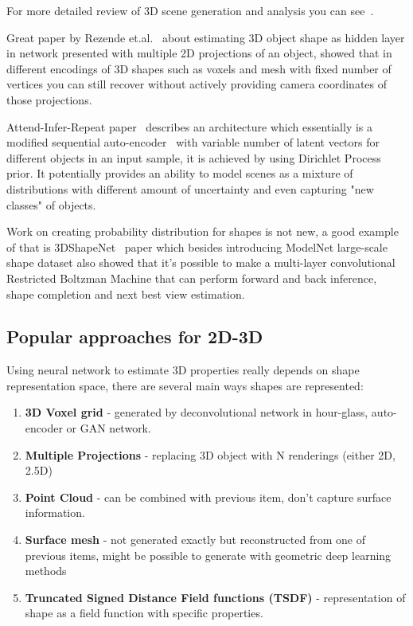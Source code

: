 For more detailed review of 3D scene generation and analysis you can see~\cite{2017arXiv170609577M}.

Great paper by Rezende et.al.~\cite{rezende2016unsupervised} about estimating 3D object shape as hidden layer in network presented with multiple 2D projections of an object, showed that in different encodings of 3D shapes such as voxels and mesh with fixed number of vertices you can still recover without actively providing camera coordinates of those projections. 

Attend-Infer-Repeat paper~\cite{eslami2016attend} describes an architecture which essentially is a modified sequential auto-encoder~\cite{gregor2015draw} with variable number of latent vectors for different objects in an input sample, it is achieved by using Dirichlet Process prior. It potentially provides an ability to model scenes as a mixture of distributions with different amount of uncertainty and even capturing "new classes" of objects.

Work on creating probability distribution for shapes is not new, a good example of that is 3DShapeNet~\cite{wu20153d} paper which besides introducing ModelNet large-scale shape dataset also showed that it's possible to make a multi-layer convolutional Restricted Boltzman Machine that can perform forward and back inference, shape completion and next best view estimation.

\subsection{Popular approaches for 2D-3D}
\label{sec:approaches}

Using neural network to estimate 3D properties really depends on shape representation space, there are several main ways shapes are represented:

\begin{enumerate}
    \item \textbf{3D Voxel grid} - generated by deconvolutional network in hour-glass, auto-encoder or GAN network.
    \item \textbf{Multiple Projections} - replacing 3D object with N renderings (either 2D, 2.5D)
    \item \textbf{Point Cloud} - can be combined with previous item, don't capture surface information.
    \item \textbf{Surface mesh} - not generated exactly but reconstructed from one of previous items, might be possible to generate with geometric deep learning methods
    \item \textbf{Truncated Signed Distance Field functions (TSDF)} - representation of shape as a field function with specific properties.
\end{enumerate}

